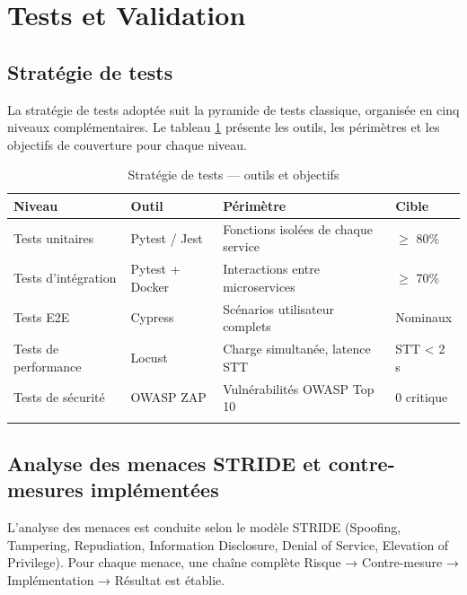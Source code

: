 \section{Tests et Validation}

\subsection{Stratégie de tests}
La stratégie de tests adoptée suit la pyramide de tests classique, organisée en cinq niveaux complémentaires. Le tableau \ref{tab:test_strategy} présente les outils, les périmètres et les objectifs de couverture pour chaque niveau.

\begin{longtable}{|m{3cm}|m{2.5cm}|m{4.5cm}|m{2.5cm}|}
\hline
\textbf{Niveau} & \textbf{Outil} & \textbf{Périmètre} & \textbf{Cible} \\
\hline
\endhead
\endfoot
\endlastfoot
\hline
Tests unitaires & Pytest / Jest & Fonctions isolées de chaque service & $\geq$ 80\% \\
\hline
Tests d'intégration & Pytest + Docker & Interactions entre microservices & $\geq$ 70\% \\
\hline
Tests E2E & Cypress & Scénarios utilisateur complets & Nominaux \\
\hline
Tests de performance & Locust & Charge simultanée, latence STT & STT < 2 s \\
\hline
Tests de sécurité & OWASP ZAP & Vulnérabilités OWASP Top 10 & 0 critique \\
\hline
\captionsetup{justification=centering,margin=2cm}
\caption{Stratégie de tests — outils et objectifs}
\label{tab:test_strategy}
\end{longtable}

\subsection{Analyse des menaces STRIDE et contre-mesures implémentées}
L'analyse des menaces est conduite selon le modèle STRIDE (Spoofing, Tampering, Repudiation, Information Disclosure, Denial of Service, Elevation of Privilege). Pour chaque menace, une chaîne complète Risque → Contre-mesure → Implémentation → Résultat est établie.

